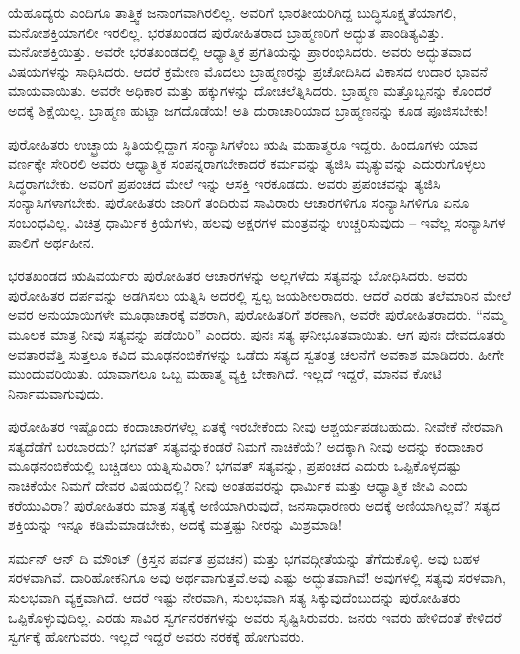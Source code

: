ಯೆಹೂದ್ಯರು ಎಂದಿಗೂ ತಾತ್ತ್ವಿಕ ಜನಾಂಗವಾಗಿರಲಿಲ್ಲ. ಅವರಿಗೆ ಭಾರತೀಯರಿಗಿದ್ದ ಬುದ್ಧಿಸೂಕ್ಷ್ಮತೆಯಾಗಲಿ, ಮನೋಶಕ್ತಿಯಾಗಲೀ ಇರಲಿಲ್ಲ. ಭರತಖಂಡದ ಪುರೋಹಿತರಾದ ಬ್ರಾಹ್ಮಣರಿಗೆ ಅದ್ಭುತ ಪಾಂಡಿತ್ಯವಿತ್ತು. ಮನೋಶಕ್ತಿಯಿತ್ತು. ಅವರೇ ಭರತಖಂಡದಲ್ಲಿ ಆಧ್ಯಾತ್ಮಿಕ ಪ್ರಗತಿಯನ್ನು ಪ್ರಾರಂಭಿಸಿದರು. ಅವರು ಅದ್ಭುತವಾದ ವಿಷಯಗಳನ್ನು ಸಾಧಿಸಿದರು. ಆದರೆ ಕ್ರಮೇಣ ಮೊದಲು ಬ್ರಾಹ್ಮಣರನ್ನು ಪ್ರಚೋದಿಸಿದ ವಿಕಾಸದ ಉದಾರ ಭಾವನೆ ಮಾಯವಾಯಿತು. ಅವರೇ ಅಧಿಕಾರ ಮತ್ತು ಹಕ್ಕುಗಳನ್ನು ದೋಚಲೆತ್ನಿಸಿದರು. ಬ್ರಾಹ್ಮಣ ಮತ್ತೊಬ್ಬನನ್ನು ಕೊಂದರೆ ಅದಕ್ಕೆ ಶಿಕ್ಷೆಯಿಲ್ಲ. ಬ್ರಾಹ್ಮಣ ಹುಟ್ಟಾ ಜಗದೊಡೆಯ! ಅತಿ ದುರಾಚಾರಿಯಾದ ಬ್ರಾಹ್ಮಣನನ್ನು ಕೂಡ ಪೂಜಿಸಬೇಕು!

ಪುರೋಹಿತರು ಉಚ್ಛ್ರಾಯ ಸ್ಥಿತಿಯಲ್ಲಿದ್ದಾಗ ಸಂನ್ಯಾಸಿಗಳೆಂಬ ಋಷಿ ಮಹಾತ್ಮರೂ ಇದ್ದರು. ಹಿಂದೂಗಳು ಯಾವ ವರ್ಣಕ್ಕೇ ಸೇರಿರಲಿ ಅವರು ಆಧ್ಯಾತ್ಮಿಕ ಸಂಪನ್ನರಾಗ\-ಬೇಕಾದರೆ ಕರ್ಮವನ್ನು ತ್ಯಜಿಸಿ ಮೃತ್ಯುವನ್ನು ಎದುರುಗೊಳ್ಳಲು ಸಿದ್ಧರಾಗಬೇಕು. ಅವರಿಗೆ ಪ್ರಪಂಚದ ಮೇಲೆ ಇನ್ನು ಆಸಕ್ತಿ ಇರಕೂಡದು. ಅವರು ಪ್ರಪಂಚವನ್ನು ತ್ಯಜಿಸಿ ಸಂನ್ಯಾಸಿಗಳಾಗಬೇಕು. ಪುರೋಹಿತರು ಜಾರಿಗೆ ತಂದಿರುವ ಸಾವಿರಾರು ಆಚಾರಗಳಿಗೂ ಸಂನ್ಯಾಸಿಗಳಿಗೂ ಏನೂ ಸಂಬಂಧವಿಲ್ಲ. ವಿಚಿತ್ರ ಧಾರ್ಮಿಕ ಕ್ರಿಯೆಗಳು, ಹಲವು ಅಕ್ಷರಗಳ ಮಂತ್ರವನ್ನು ಉಚ್ಚರಿಸುವುದು – ಇವೆಲ್ಲ ಸಂನ್ಯಾಸಿಗಳ ಪಾಲಿಗೆ ಅರ್ಥಹೀನ.

ಭರತಖಂಡದ ಋಷಿವರ್ಯರು ಪುರೋಹಿತರ ಆಚಾರಗಳನ್ನು ಅಲ್ಲಗಳೆದು ಸತ್ಯವನ್ನು ಬೋಧಿಸಿದರು. ಅವರು ಪುರೋಹಿತರ ದರ್ಪವನ್ನು ಅಡಗಿಸಲು ಯತ್ನಿಸಿ ಅದರಲ್ಲಿ ಸ್ವಲ್ಪ ಜಯಶೀಲರಾದರು. ಆದರೆ ಎರಡು ತಲೆಮಾರಿನ ಮೇಲೆ ಅವರ ಅನುಯಾಯಿಗಳೇ ಮೂಢಾಚಾರಕ್ಕೆ ವಶರಾಗಿ, ಪುರೋಹಿತರಿಗೆ ಶರಣಾಗಿ, ಅವರೇ ಪುರೋಹಿತರಾದರು. “ನಮ್ಮ ಮೂಲಕ ಮಾತ್ರ ನೀವು ಸತ್ಯವನ್ನು ಪಡೆಯಿರಿ” ಎಂದರು. ಪುನಃ ಸತ್ಯ ಘನೀಭೂತ\-ವಾಯಿತು. ಆಗ ಪುನಃ ದೇವದೂತರು ಅವತಾರವೆತ್ತಿ ಸುತ್ತಲೂ ಕವಿದ ಮೂಢನಂಬಿಕೆಗಳನ್ನು ಒಡೆದು ಸತ್ಯದ ಸ್ವತಂತ್ರ ಚಲನೆಗೆ ಅವಕಾಶ ಮಾಡಿದರು. ಹೀಗೇ ಮುಂದುವರಿಯಿತು. ಯಾವಾಗಲೂ ಒಬ್ಬ ಮಹಾತ್ಮ ವ್ಯಕ್ತಿ ಬೇಕಾಗಿದೆ. ಇಲ್ಲದೆ ಇದ್ದರೆ, ಮಾನವ ಕೋಟಿ ನಿರ್ನಾಮವಾಗುವುದು.

ಪುರೋಹಿತರ ಇಷ್ಟೊಂದು ಕಂದಾಚಾರಗಳೆಲ್ಲ ಏತಕ್ಕೆ ಇರಬೇಕೆಂದು ನೀವು ಆಶ್ಚರ್ಯಪಡಬಹುದು. ನೀವೇಕೆ ನೇರವಾಗಿ ಸತ್ಯದೆಡೆಗೆ ಬರಬಾರದು? ಭಗವತ್​ ಸತ್ಯವನ್ನು\break ಕಂಡರೆ ನಿಮಗೆ ನಾಚಿಕೆಯೆ? ಅದಕ್ಕಾಗಿ ನೀವು ಅದನ್ನು ಕಂದಾಚಾರ ಮೂಢನಂಬಿಕೆಯಲ್ಲಿ ಬಚ್ಚಿಡಲು ಯತ್ನಿಸುವಿರಾ? ಭಗವತ್​ ಸತ್ಯವನ್ನು, ಪ್ರಪಂಚದ ಎದುರು ಒಪ್ಪಿಕೊಳ್ಳದಷ್ಟು ನಾಚಿಕೆಯೇ ನಿಮಗೆ ದೇವರ ವಿಷಯದಲ್ಲಿ? ನೀವು ಅಂತಹವರನ್ನು ಧಾರ್ಮಿಕ ಮತ್ತು ಆಧ್ಯಾತ್ಮಿಕ ಜೀವಿ ಎಂದು ಕರೆಯುವಿರಾ? ಪುರೋಹಿತರು ಮಾತ್ರ ಸತ್ಯಕ್ಕೆ ಅಣಿಯಾಗಿರುವುದೆ, ಜನಸಾಧಾರಣರು ಅದಕ್ಕೆ ಅಣಿಯಾಗಿಲ್ಲವೆ? ಸತ್ಯದ ಶಕ್ತಿಯನ್ನು ಇನ್ನೂ ಕಡಿಮೆಮಾಡಬೇಕು, ಅದಕ್ಕೆ ಮತ್ತಷ್ಟು ನೀರನ್ನು ಮಿಶ್ರಮಾಡಿ!

ಸರ್ಮನ್​ ಆನ್​ ದಿ ಮೌಂಟ್​ (ಕ್ರಿಸ್ತನ ಪರ್ವತ ಪ್ರವಚನ) ಮತ್ತು ಭಗವದ್ಗೀತೆಯನ್ನು ತೆಗೆದುಕೊಳ್ಳಿ. ಅವು ಬಹಳ ಸರಳವಾಗಿವೆ. ದಾರಿಹೋಕನಿಗೂ ಅವು ಅರ್ಥವಾಗುತ್ತವೆ.\break ಅವು ಎಷ್ಟು ಅದ್ಭುತವಾಗಿವೆ! ಅವುಗಳಲ್ಲಿ ಸತ್ಯವು ಸರಳವಾಗಿ, ಸುಲಭವಾಗಿ ವ್ಯಕ್ತ\-ವಾಗಿದೆ. ಆದರೆ ಇಷ್ಟು ನೇರವಾಗಿ, ಸುಲಭವಾಗಿ ಸತ್ಯ ಸಿಕ್ಕುವುದೆಂಬುದನ್ನು ಪುರೋಹಿತರು ಒಪ್ಪಿಕೊಳ್ಳುವುದಿಲ್ಲ. ಎರಡು ಸಾವಿರ ಸ್ವರ್ಗನರಕಗಳನ್ನು ಅವರು ಸೃಷ್ಟಿಸಿರುವರು. ಜನರು ಇವರು ಹೇಳಿದಂತೆ ಕೇಳಿದರೆ ಸ್ವರ್ಗಕ್ಕೆ ಹೋಗುವರು. ಇಲ್ಲದೆ ಇದ್ದರೆ ಅವರು ನರಕಕ್ಕೆ ಹೋಗುವರು.

